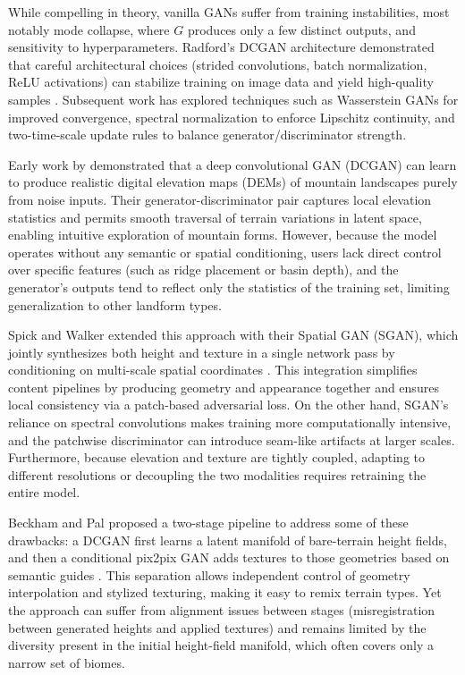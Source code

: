 While compelling in theory, vanilla GANs suffer from training instabilities, most notably mode collapse, where $G$ produces only a few distinct outputs, and sensitivity to hyperparameters.  Radford's DCGAN architecture demonstrated that careful architectural choices (strided convolutions, batch normalization, ReLU activations) can stabilize training on image data and yield high-quality samples \cite{Radford2015}. Subsequent work has explored techniques such as Wasserstein GANs for improved convergence, spectral normalization to enforce Lipschitz continuity, and two-time-scale update rules to balance generator/discriminator strength.  



Early work by \cite{WulffJensen2018} demonstrated that a deep convolutional GAN (DCGAN) can learn to produce realistic digital elevation maps (DEMs) of mountain landscapes purely from noise inputs. Their generator-discriminator pair captures local elevation statistics and permits smooth traversal of terrain variations in latent space, enabling intuitive exploration of mountain forms. However, because the model operates without any semantic or spatial conditioning, users lack direct control over specific features (such as ridge placement or basin depth), and the generator's outputs tend to reflect only the statistics of the training set, limiting generalization to other landform types.

Spick and Walker extended this approach with their Spatial GAN (SGAN), which jointly synthesizes both height and texture in a single network pass by conditioning on multi-scale spatial coordinates \cite{Spick2019}. This integration simplifies content pipelines by producing geometry and appearance together and ensures local consistency via a patch-based adversarial loss. On the other hand, SGAN's reliance on spectral convolutions makes training more computationally intensive, and the patchwise discriminator can introduce seam-like artifacts at larger scales. Furthermore, because elevation and texture are tightly coupled, adapting to different resolutions or decoupling the two modalities requires retraining the entire model.

Beckham and Pal proposed a two-stage pipeline to address some of these drawbacks: a DCGAN first learns a latent manifold of bare-terrain height fields, and then a conditional pix2pix GAN adds textures to those geometries based on semantic guides \cite{Beckham2017}. This separation allows independent control of geometry interpolation and stylized texturing, making it easy to remix terrain types. Yet the approach can suffer from alignment issues between stages (misregistration between generated heights and applied textures) and remains limited by the diversity present in the initial height-field manifold, which often covers only a narrow set of biomes.

